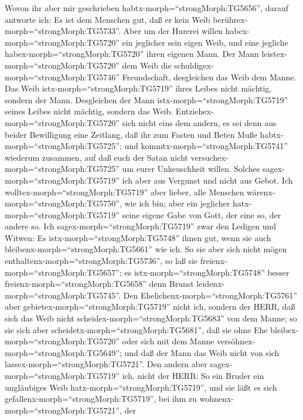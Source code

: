  Wovon ihr aber mir geschrieben
habtx-morph=``strongMorph:TG5656'', darauf antworte ich: Es ist dem
Menschen gut, daß er kein Weib berührex-morph=``strongMorph:TG5733''.
 Aber um der Hurerei willen
habex-morph=``strongMorph:TG5720'' ein jeglicher sein eigen Weib, und
eine jegliche habex-morph=``strongMorph:TG5720'' ihren eigenen Mann.
 Der Mann leistex-morph=``strongMorph:TG5720'' dem Weib die
schuldigex-morph=``strongMorph:TG5746'' Freundschaft, desgleichen das
Weib dem Manne.  Das Weib istx-morph=``strongMorph:TG5719''
ihres Leibes nicht mächtig, sondern der Mann. Desgleichen der Mann
istx-morph=``strongMorph:TG5719'' seines Leibes nicht mächtig, sondern
das Weib.  Entziehex-morph=``strongMorph:TG5720'' sich nicht
eins dem andern, es sei denn aus beider Bewilligung eine Zeitlang, daß
ihr zum Fasten und Beten Muße habtx-morph=``strongMorph:TG5725''; und
kommtx-morph=``strongMorph:TG5741'' wiederum zusammen, auf daß euch der
Satan nicht versuchex-morph=``strongMorph:TG5725'' um eurer Unkeuschheit
willen.  Solches sagex-morph=``strongMorph:TG5719'' ich aber
aus Vergunst und nicht aus Gebot.  Ich
wolltex-morph=``strongMorph:TG5719'' aber lieber, alle Menschen
wärenx-morph=``strongMorph:TG5750'', wie ich bin; aber ein jeglicher
hatx-morph=``strongMorph:TG5719'' seine eigene Gabe von Gott, der eine
so, der andere so.  Ich sagex-morph=``strongMorph:TG5719''
zwar den Ledigen und Witwen: Es istx-morph=``strongMorph:TG5748'' ihnen
gut, wenn sie auch bleibenx-morph=``strongMorph:TG5661'' wie ich.
 So sie aber sich nicht mögen
enthaltenx-morph=``strongMorph:TG5736'', so laß sie
freienx-morph=``strongMorph:TG5657''; es
istx-morph=``strongMorph:TG5748'' besser
freienx-morph=``strongMorph:TG5658'' denn Brunst
leidenx-morph=``strongMorph:TG5745''.  Den
Ehelichenx-morph=``strongMorph:TG5761'' aber
gebietex-morph=``strongMorph:TG5719'' nicht ich, sondern der HERR, daß
sich das Weib nicht scheidex-morph=``strongMorph:TG5683'' von dem Manne;
 so sie sich aber scheidetx-morph=``strongMorph:TG5681'',
daß sie ohne Ehe bleibex-morph=``strongMorph:TG5720'' oder sich mit dem
Manne versöhnex-morph=``strongMorph:TG5649''; und daß der Mann das Weib
nicht von sich lassex-morph=``strongMorph:TG5721''.  Den
andern aber sagex-morph=``strongMorph:TG5719'' ich, nicht der HERR: So
ein Bruder ein ungläubiges Weib hatx-morph=``strongMorph:TG5719'', und
sie läßt es sich gefallenx-morph=``strongMorph:TG5719'', bei ihm zu
wohnenx-morph=``strongMorph:TG5721'', der
